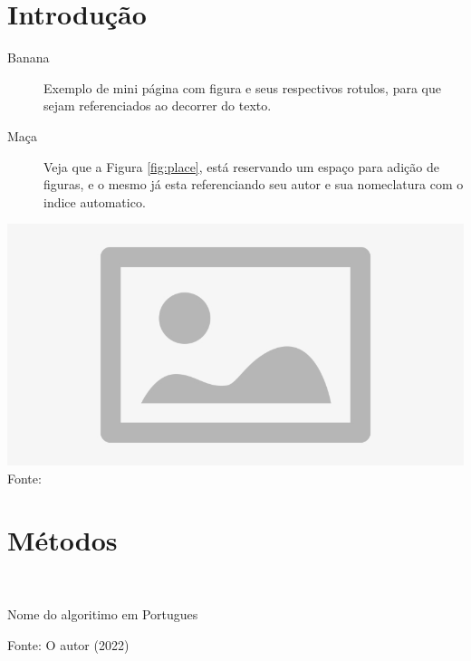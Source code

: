 
\section{Introdução}

\noindent \begin{minipage}[c]{0.6\textwidth}
  \vspace {1cm}
  \begin{description}
    \item [Banana] Exemplo de mini página com figura e seus respectivos rotulos, para que sejam referenciados ao decorrer do texto.
    \item [Maça] Veja que a Figura \ref{fig:place}, está reservando um espaço para adição de figuras, e o mesmo já esta referenciando seu autor e sua nomeclatura com o indice automatico.
  \end{description}

\end{minipage}
\begin{minipage}[c]{0.4\textwidth}
  \includegraphics[width=\textwidth]{figure/placeholder.jpg}
  \label{fig:place}
  {\fontsize{10pt}{\baselineskip}\selectfont
    Fonte: }
\end{minipage}


\section{Métodos}

\begin{algorithm}[H]
  \SetAlgoLined %
   \
    \
   \caption{Nome do algoritimo em Portugues}
   {\fontsize{10pt}{\baselineskip}\selectfont
   Fonte: O autor (2022)}

\end{algorithm}
